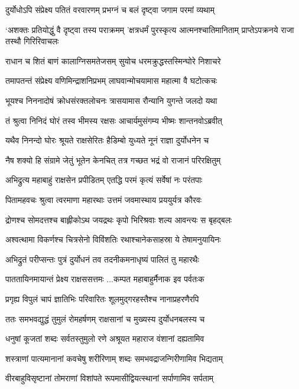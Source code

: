 \twolineshloka
{दुर्योधोऽपि संप्रेक्ष्य पतितं वरवारणम्}
{प्रभग्नं च बलं दृष्ट्वा जगाम परमां व्यथाम्}


\threelineshloka
{`अशक्तः प्रतियोद्धुं वै दृष्ट्वा तस्य पराक्रमम्}
{'क्षत्रधर्मं पुरस्कृत्य आत्मनश्चातिमानिताम्}
{प्राप्तेऽपक्रनये राजा तस्थौ गिरिरिवाचलः}


\twolineshloka
{राधान च शितं बाणं कालाग्निसमतेजसम्}
{सुयोच धरमक्रुद्धस्तस्मिन्घोरे निशाचरे}


\twolineshloka
{तमापतन्तं संप्रेक्ष्य वणिमिन्द्राशनिप्रभम्}
{लाघवान्मोचयामास महात्मा वै घटोत्कचः}


\twolineshloka
{भूयश्च निननादोषं क्रोधसंरक्तलोचनः}
{त्रासयामास रौन्यानि युगन्ते जलदो यथा}


\twolineshloka
{तं श्रुत्वा निनिदं घोरं तस्व भीमस्य रक्षसः}
{आचार्यमुसंगम्य भीष्मः शान्तनवोऽब्रवीत्}


\twolineshloka
{यथैव निनन्दो घोरः श्रूयते राक्षसेरितः}
{हैडिम्बो युध्यते नूनं राज्ञा दुर्योधनेन च}


\twolineshloka
{नैष शक्यो हि संग्रामे जेतुं भूतेन केनचित्}
{तत्र गच्छत भद्रं वो राजानं परिरक्षितुम्}


\twolineshloka
{अभिद्रुत्य महाबाहुं राक्षसेन प्रपीडितम्}
{एतद्धि परमं कृत्यं सर्वेषां नः परंतपाः}


\twolineshloka
{पितामहवचः श्रुत्वा त्वरमाणा महारथाः}
{उत्तमं जवमास्थाय प्रययुर्यत्र कौरवः}


\twolineshloka
{द्रोणश्च सोमदत्तश्च बाह्लीकोऽथ जयद्रथः}
{कृपो भिरिश्रवाः शल्य आवन्त्यः स बृहद्बलः}


\twolineshloka
{अश्वत्थामा विकर्णश्च चित्रसेनो विविंशतिः}
{रथाश्चानेकसाहस्रा ये तेषामनुयायिनः}


\twolineshloka
{अभिद्रुतं परीप्सन्तः पुत्रं दुर्योधनं तव}
{तदनीकमनाधृष्यं पालितं तु महारथैः}


\twolineshloka
{पाततायिनमायान्तं प्रेक्ष्य राक्षससत्तमः}
{...कम्पत महाबाहुर्मैनाक इव पर्वतःक}


\twolineshloka
{प्रगृह्य विपुलं चापं ज्ञातिभिः परिवारितः}
{शूलमुद्गरहस्तैश्च नानाप्रहरणैरपि}


\twolineshloka
{ततः समभवद्युद्धं तुमुलं रोमहर्षणम्}
{राक्षसानां च मुख्यस्य दुर्योधनबलस्य च}


\twolineshloka
{धनुषां कूजतां शब्दः सर्वतस्तुमुलो रणे}
{अश्रूयत महाराज वंशानां दह्यतामिव}


\twolineshloka
{शस्त्राणां पात्यमानानां कवचेषु शरीरिणाम्}
{शब्दः समभवद्राजन्गिरीणामिव भिद्यताम्}


\twolineshloka
{वीरबाहुविसृष्टानां तोमराणां विशांपते}
{रूपमासीद्वियत्स्थानां सर्पाणामिव सर्पताम्}


